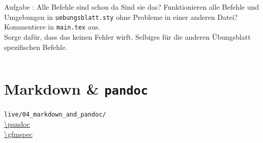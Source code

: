 \documentclass[14pt,aspectratio=169]{beamer}
\begin{document}
\begin{frame}{\insertsection}
    \begin{alertblock}{Aufgabe \aufgabennummer: Alle Befehle sind schon da \small\faMusic}
        Sind sie das? Funktionieren alle Befehle und Umgebungen in 
        \texttt{uebungsblatt.sty} ohne Probleme in einer anderen Datei? \\[1em]
        Kommentiere \texttt{\EXERCISES} in \texttt{main.tex} aus.\\
        Sorge dafür, dass das keinen Fehler wirft. Selbiges für die anderen
        Übungsblatt spezifischen Befehle.
    \end{alertblock}
\end{frame}

\begin{frame}{\insertsection}
    \begin{columns}
        
        
        
        \material[height=.7\textwidth]{\overleafClass}
        
        
    \end{columns}
\end{frame}




\section{\faMarkdown Markdown \& \texttt{pandoc}}
\begin{frame}
    \sectionpage
    \vspace{.5em}
    \large \faFolderOpen \texttt{live/04_markdown_and_pandoc/}\\
           \faLink \url{\pandoc} \\
           \faLink \url{\gfmspec}
\end{frame}
\end{document}

